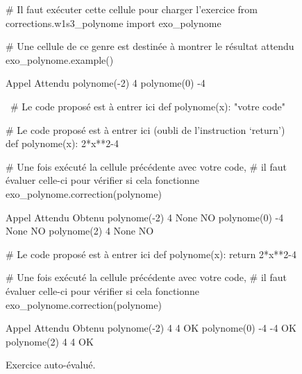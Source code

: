 \begin{figure}[th]
\begin{nbjupyterin}{1}
# Il faut exécuter cette cellule pour charger l'exercice
from corrections.w1s3_polynome import exo_polynome
\end{nbjupyterin}
\vspace*{4pt}
\begin{nbjupyterin}{2}
# Une cellule de ce genre est destinée à montrer le résultat attendu
exo_polynome.example()
\end{nbjupyterin}
\begin{nbjupyterout}{2}
Appel          Attendu
polynome(-2)    4
polynome(0)    -4
\end{nbjupyterout}
\begin{nbjupyterin}{\,}
# Le code proposé est à entrer ici
def polynome(x):
    "votre code"
\end{nbjupyterin}
\vspace*{4pt}
\begin{nbjupyterin}{3}
# Le code proposé est à entrer ici (oubli de l'instruction `return')
def polynome(x):
    2*x**2-4
\end{nbjupyterin}
\vspace*{4pt}
\begin{nbjupyterin}{4}
# Une fois exécuté la cellule précédente avec votre code,
# il faut évaluer celle-ci pour vérifier si cela fonctionne
exo_polynome.correction(polynome)
\end{nbjupyterin}
\begin{nbjupyterout}[colback=pynbcodefalsebgcolor]{4}
Appel          Attendu      Obtenu
polynome(-2)     4           None     NO
polynome(0)     -4           None     NO
polynome(2)      4           None     NO
\end{nbjupyterout}
\begin{nbjupyterin}{3}
# Le code proposé est à entrer ici
def polynome(x):
    return 2*x**2-4
\end{nbjupyterin}
\vspace*{4pt}
\begin{nbjupyterin}{4}
# Une fois exécuté la cellule précédente avec votre code,
# il faut évaluer celle-ci pour vérifier si cela fonctionne
exo_polynome.correction(polynome)
\end{nbjupyterin}
\begin{nbjupyterout}[colback=pynbcodetruebgcolor]{4}
Appel          Attendu      Obtenu
polynome(-2)     4             4      OK
polynome(0)     -4            -4      OK
polynome(2)      4             4      OK
\end{nbjupyterout}
\vspace*{2pt}
\caption{\label{fig:X.6}Exercice auto-évalué.}
\end{figure}

